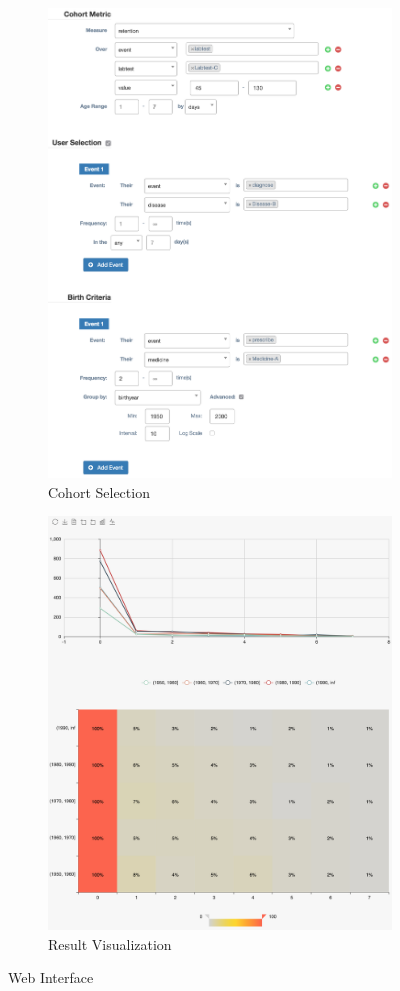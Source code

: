 \documentclass[10pt,conference,letterpaper]{IEEEtran}
\begin{document}
\begin{figure}
\begin{subfigure}{0.4\textwidth}
    \includegraphics[width=0.9\linewidth]{query.png}
    \caption{Cohort Selection}
    \label{fig:cohort}
\end{subfigure}%
\begin{subfigure}{0.3\textwidth}
    \centering
    \includegraphics[width=0.9\linewidth]{chart.png}
    \caption{Result Visualization}
    \label{fig:visual}
\end{subfigure}%
\caption{Web Interface}
\end{figure}
\end{document}
